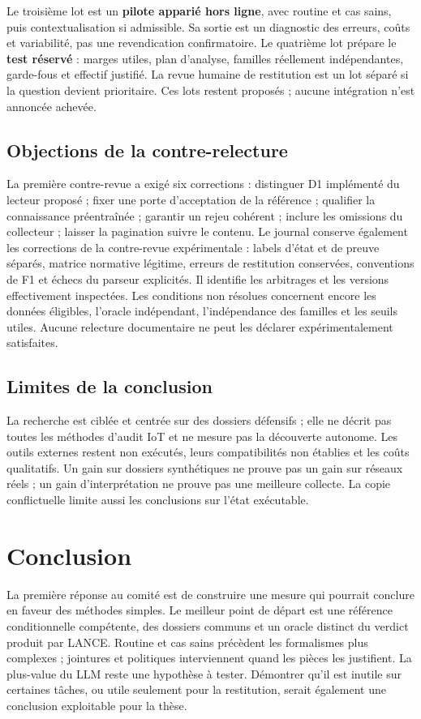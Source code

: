 \documentclass[11pt,a4paper]{article}
\begin{document}
Le troisième lot est un \textbf{pilote apparié hors ligne}, avec routine et
cas sains, puis contextualisation si admissible. Sa sortie est un diagnostic
des erreurs, coûts et variabilité, pas une revendication confirmatoire. Le
quatrième lot prépare le \textbf{test réservé} : marges utiles, plan d'analyse,
familles réellement indépendantes, garde-fous et effectif justifié. La revue
humaine de restitution est un lot séparé si la question devient prioritaire.
Ces lots restent proposés ; aucune intégration n'est annoncée achevée.

\subsection{Objections de la contre-relecture}
La première contre-revue a exigé six corrections : distinguer D1 implémenté
du lecteur proposé ; fixer une porte d'acceptation de la référence ; qualifier
la connaissance préentraînée ; garantir un rejeu cohérent ; inclure les omissions
du collecteur ; laisser la pagination suivre le contenu. Le journal conserve
également les corrections de la contre-revue expérimentale : labels d'état et
de preuve séparés, matrice normative légitime, erreurs de restitution conservées,
conventions de F1 et échecs du parseur explicités. Il identifie
les arbitrages et les versions effectivement inspectées. Les conditions non
résolues concernent encore les données éligibles, l'oracle indépendant,
l'indépendance des familles et les seuils utiles. Aucune relecture documentaire
ne peut les déclarer expérimentalement satisfaites.

\subsection{Limites de la conclusion}
La recherche est ciblée et centrée sur des dossiers défensifs ; elle ne décrit
pas toutes les méthodes d'audit IoT et ne mesure pas la découverte autonome.
Les outils externes restent non exécutés, leurs compatibilités non établies et
les coûts qualitatifs. Un gain sur dossiers synthétiques ne prouve pas un gain
sur réseaux réels ; un gain d'interprétation ne prouve pas une meilleure collecte.
La copie conflictuelle limite aussi les conclusions sur l'état exécutable.

\section{Conclusion}
La première réponse au comité est de construire une mesure qui pourrait
conclure en faveur des méthodes simples. Le meilleur point de départ est une
référence conditionnelle compétente, des dossiers communs et un oracle distinct
du verdict produit par LANCE. Routine et cas sains précèdent les formalismes
plus complexes ; jointures et politiques interviennent quand les pièces les
justifient. La plus-value du LLM reste une hypothèse à tester. Démontrer qu'il
est inutile sur certaines tâches, ou utile seulement pour la restitution,
serait également une conclusion exploitable pour la thèse.
\end{document}
